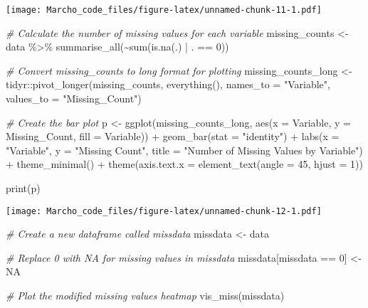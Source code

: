 \documentclass[
]{article}
\newenvironment{Shaded}{\begin{snugshade}}{\end{snugshade}}
\newcommand{\AttributeTok}[1]{\textcolor[rgb]{0.77,0.63,0.00}{#1}}
\newcommand{\CommentTok}[1]{\textcolor[rgb]{0.56,0.35,0.01}{\textit{#1}}}
\newcommand{\ConstantTok}[1]{\textcolor[rgb]{0.00,0.00,0.00}{#1}}
\newcommand{\DecValTok}[1]{\textcolor[rgb]{0.00,0.00,0.81}{#1}}
\newcommand{\FunctionTok}[1]{\textcolor[rgb]{0.00,0.00,0.00}{#1}}
\newcommand{\NormalTok}[1]{#1}
\newcommand{\OtherTok}[1]{\textcolor[rgb]{0.56,0.35,0.01}{#1}}
\newcommand{\SpecialCharTok}[1]{\textcolor[rgb]{0.00,0.00,0.00}{#1}}
\newcommand{\StringTok}[1]{\textcolor[rgb]{0.31,0.60,0.02}{#1}}
\begin{document}
\texttt{[image: Marcho\_code\_files/figure-latex/unnamed-chunk-11-1.pdf]}

\begin{Shaded}
\begin{Highlighting}[]
\CommentTok{\# Calculate the number of missing values for each variable}
\NormalTok{missing\_counts }\OtherTok{\textless{}{-}}\NormalTok{ data }\SpecialCharTok{\%\textgreater{}\%}
  \FunctionTok{summarise\_all}\NormalTok{(}\SpecialCharTok{\textasciitilde{}}\FunctionTok{sum}\NormalTok{(}\FunctionTok{is.na}\NormalTok{(.) }\SpecialCharTok{|}\NormalTok{ . }\SpecialCharTok{==} \DecValTok{0}\NormalTok{))}

\CommentTok{\# Convert missing\_counts to long format for plotting}
\NormalTok{missing\_counts\_long }\OtherTok{\textless{}{-}}\NormalTok{ tidyr}\SpecialCharTok{::}\FunctionTok{pivot\_longer}\NormalTok{(missing\_counts, }\FunctionTok{everything}\NormalTok{(), }\AttributeTok{names\_to =} \StringTok{"Variable"}\NormalTok{, }\AttributeTok{values\_to =} \StringTok{"Missing\_Count"}\NormalTok{)}

\CommentTok{\# Create the bar plot}
\NormalTok{p }\OtherTok{\textless{}{-}} \FunctionTok{ggplot}\NormalTok{(missing\_counts\_long, }\FunctionTok{aes}\NormalTok{(}\AttributeTok{x =}\NormalTok{ Variable, }\AttributeTok{y =}\NormalTok{ Missing\_Count, }\AttributeTok{fill =}\NormalTok{ Variable)) }\SpecialCharTok{+}
  \FunctionTok{geom\_bar}\NormalTok{(}\AttributeTok{stat =} \StringTok{"identity"}\NormalTok{) }\SpecialCharTok{+}
  \FunctionTok{labs}\NormalTok{(}\AttributeTok{x =} \StringTok{"Variable"}\NormalTok{, }\AttributeTok{y =} \StringTok{"Missing Count"}\NormalTok{, }\AttributeTok{title =} \StringTok{"Number of Missing Values by Variable"}\NormalTok{) }\SpecialCharTok{+}
  \FunctionTok{theme\_minimal}\NormalTok{() }\SpecialCharTok{+}
  \FunctionTok{theme}\NormalTok{(}\AttributeTok{axis.text.x =} \FunctionTok{element\_text}\NormalTok{(}\AttributeTok{angle =} \DecValTok{45}\NormalTok{, }\AttributeTok{hjust =} \DecValTok{1}\NormalTok{))}

\FunctionTok{print}\NormalTok{(p)}
\end{Highlighting}
\end{Shaded}

\texttt{[image: Marcho\_code\_files/figure-latex/unnamed-chunk-12-1.pdf]}

\begin{Shaded}
\begin{Highlighting}[]
\CommentTok{\# Create a new dataframe called missdata}
\NormalTok{missdata }\OtherTok{\textless{}{-}}\NormalTok{ data}

\CommentTok{\# Replace 0 with NA for missing values in missdata}
\NormalTok{missdata[missdata }\SpecialCharTok{==} \DecValTok{0}\NormalTok{] }\OtherTok{\textless{}{-}} \ConstantTok{NA}

\CommentTok{\# Plot the modified missing values heatmap}
\FunctionTok{vis\_miss}\NormalTok{(missdata)}
\end{Highlighting}
\end{Shaded}
\end{document}
